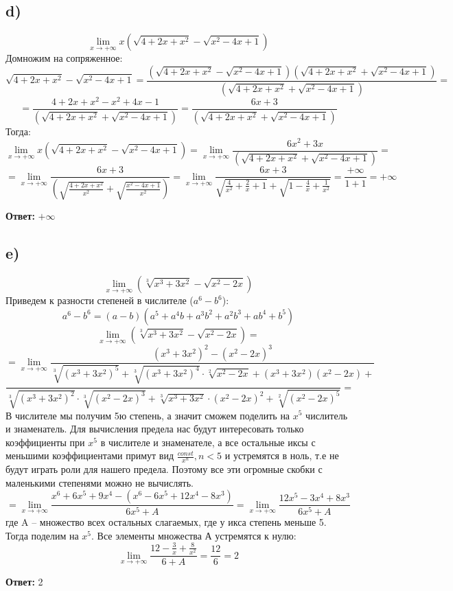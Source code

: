 \documentclass[a4paper,12pt]{article}
\begin{document}
\subsection*{d)}
\[
\lim_{x \rightarrow +\infty} x(\sqrt{4 + 2x + x^2} -\sqrt{x^2 - 4x +1})
\]
Домножим на сопряженное:
\[
\sqrt{4 + 2x + x^2} -\sqrt{x^2 - 4x +1} = \frac{(\sqrt{4 + 2x + x^2} -\sqrt{x^2 - 4x +1})(\sqrt{4 + 2x + x^2} +\sqrt{x^2 - 4x +1})}{(\sqrt{4 + 2x + x^2} +\sqrt{x^2 - 4x +1})} =
\]
\[
= \frac{4+2x+x^2 - x^2 +4x - 1}{(\sqrt{4 + 2x + x^2} +\sqrt{x^2 - 4x +1})} = \frac{6x + 3}{(\sqrt{4 + 2x + x^2} +\sqrt{x^2 - 4x +1})}
\]
Тогда:
\[
\lim_{x \rightarrow +\infty} x(\sqrt{4 + 2x + x^2} -\sqrt{x^2 - 4x +1}) = \lim_{x \rightarrow +\infty} \frac{6x^2+ 3x}{(\sqrt{4 + 2x + x^2} +\sqrt{x^2 - 4x +1})} = 
\]
\[
= \lim_{x \rightarrow +\infty} \frac{6x + 3}{(\sqrt{\frac{4+2x+x^2}{x^2}} +\sqrt{\frac{x^2 - 4x +1}{x^2}})} = \lim_{x \rightarrow +\infty} \frac{6x + 3}{\sqrt{\frac{4}{x^2} + \frac{2}{x} + 1} + \sqrt{1 - \frac{4}{x} + \frac{1}{x^2}}} = \frac{+\infty}{1 + 1} = +\infty
\]
\begin{center}
\textbf{Ответ:} $+ \infty$
\end{center}
\subsection*{e)}
\[
\lim_{x \rightarrow +\infty} (\sqrt[3]{x^3 + 3x^2} - \sqrt{x^2 - 2x})
\]
Приведем к разности степеней в числителе ($a^6 - b ^6$):
\[
a^6 - b^6 = (a-b)(a^5 + a^4b + a^3b^2 + a^2b^3 + ab^4 + b^5)
\]
\[
\lim_{x \rightarrow +\infty} (\sqrt[3]{x^3 + 3x^2} - \sqrt{x^2 - 2x}) =
\]
\[
= \lim_{x \rightarrow +\infty} \frac{(x^3+3x^2)^2 - (x^2-2x)^3}{\sqrt[3]{(x^3+3x^2)^5} + \sqrt[3]{(x^3+3x^2)^4}\cdot \sqrt[2]{x^2-2x} + (x^3+3x^2)(x^2-2x) +}
\]
\[
\frac{}{
\sqrt[3]{(x^3+3x^2)^2} \cdot \sqrt[3]{(x^2-2x)^3} + \sqrt[3]{x^3+3x^2} \cdot (x^2-2x)^2 + \sqrt[2]{(x^2-2x)^5}
} =
\]
В числителе мы получим 5ю степень, а значит сможем поделить на $x^5$ числитель и знаменатель. Для вычисления предела нас будут интересовать только коэффициенты при $x^5$ в числителе и знаменателе, а все остальные иксы с меньшими коэффициентами примут вид $\frac{const}{x^n}, n < 5$  и устремятся в ноль, т.е не будут играть роли для нашего предела. Поэтому все эти огромные скобки с маленькими степенями можно не вычислять.
\[
= \lim_{x \rightarrow +\infty} \frac{x^6 + 6x^5 + 9x^4 -(x^6 - 6x^5 + 12x^4 - 8x^3)}{6x^5 + A}
= \lim_{x \rightarrow +\infty} \frac{12x^5-3x^4+8x^3}{6x^5+A}
\]
где A -- множество всех остальных слагаемых, где у икса степень меньше 5. Тогда поделим на $x^5$. Все элементы множества А устремятся к нулю:
\[
\lim_{x \rightarrow +\infty} \frac{12 - \frac{3}{x} + \frac{8}{x^2}}{6 + A } = \frac{12}{6} = 2
\]
\begin{center}
\textbf{Ответ:} 2
\end{center}
\end{document}
